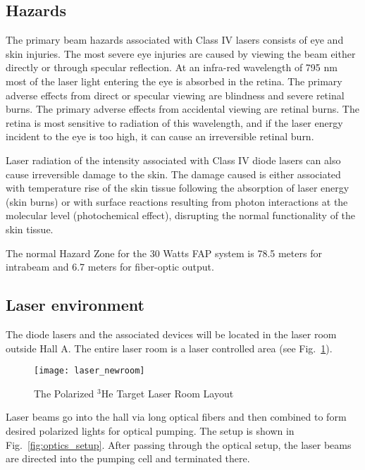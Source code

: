{\subsection{Hazards}

The primary beam hazards associated with Class IV lasers consists of eye and skin
injuries. The most severe eye injuries are caused by viewing the beam either directly
or through specular reflection. At an infra-red wavelength of 795 nm most of the
laser light entering the eye is absorbed in the retina. The primary adverse effects
from direct or specular viewing are blindness and severe retinal burns. The primary
adverse effects from accidental viewing are retinal burns. The retina is most
sensitive to radiation of this wavelength, and if the laser energy incident to the eye
is too high, it can cause an irreversible retinal burn.

Laser radiation of the intensity associated with Class IV diode lasers can also
cause irreversible damage to the skin. The damage caused is either associated with
temperature rise of the skin tissue following the absorption of laser energy (skin
burns) or with surface reactions resulting from photon interactions at the molecular
level (photochemical effect), disrupting the normal functionality of the skin tissue.

The normal Hazard Zone for the 30 Watts FAP system is 78.5 meters for intrabeam and 6.7 meters for fiber-optic output.


\subsection{Laser environment}

The diode lasers and the associated devices will be located in the
laser room outside Hall A.  The entire laser room is a
laser controlled area (see Fig.~\ref{fig:laser_newroom}).

\begin{figure}
  \centerline{\texttt{[image: laser\_newroom]}}
  \caption[Polarized $^3$He Laser Room Layout]{The Polarized $^3$He Target 
Laser Room Layout}
   \label{fig:laser_newroom} 
\end{figure}

Laser beams go into the hall via long optical fibers
and then combined to form desired polarized lights for optical pumping.
The setup is shown in Fig.~\ref{fig:optics_setup}.
After passing through the optical setup, the laser beams 
are directed into the pumping cell and terminated there. 

}
